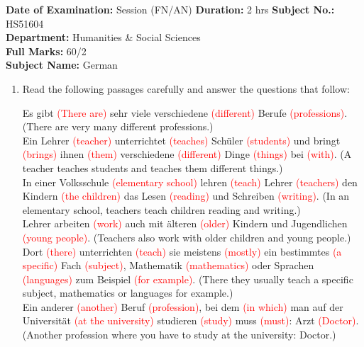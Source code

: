 \documentclass{article}
\title{}
\author{}
\date{}
\begin{document}
\maketitle

\noindent
\textbf{Date of Examination:} Session (FN/AN) \textbf{Duration:} 2 hrs \textbf{Subject No.:} HS51604 \\
\textbf{Department:} Humanities \& Social Sciences \\
\textbf{Full Marks:} 60/2 \\
\textbf{Subject Name:} German

\begin{enumerate}
    \item Read the following passages carefully and answer the questions that follow:

    Es gibt \textcolor{red}{(There are)} sehr viele verschiedene \textcolor{red}{(different)} Berufe \textcolor{red}{(professions)}. (There are very many different professions.) \\
    Ein Lehrer \textcolor{red}{(teacher)} unterrichtet \textcolor{red}{(teaches)} Schüler \textcolor{red}{(students)} und bringt \textcolor{red}{(brings)} ihnen \textcolor{red}{(them)} verschiedene \textcolor{red}{(different)} Dinge \textcolor{red}{(things)} bei \textcolor{red}{(with)}. (A teacher teaches students and teaches them different things.) \\
    In einer Volksschule \textcolor{red}{(elementary school)} lehren \textcolor{red}{(teach)} Lehrer \textcolor{red}{(teachers)} den Kindern \textcolor{red}{(the children)} das Lesen \textcolor{red}{(reading)} und Schreiben \textcolor{red}{(writing)}. (In an elementary school, teachers teach children reading and writing.) \\
    Lehrer arbeiten \textcolor{red}{(work)} auch mit älteren \textcolor{red}{(older)} Kindern und Jugendlichen \textcolor{red}{(young people)}. (Teachers also work with older children and young people.) \\
    Dort \textcolor{red}{(there)} unterrichten \textcolor{red}{(teach)} sie meistens \textcolor{red}{(mostly)} ein bestimmtes \textcolor{red}{(a specific)} Fach \textcolor{red}{(subject)}, Mathematik \textcolor{red}{(mathematics)} oder Sprachen \textcolor{red}{(languages)} zum Beispiel \textcolor{red}{(for example)}. (There they usually teach a specific subject, mathematics or languages for example.) \\
    Ein anderer \textcolor{red}{(another)} Beruf \textcolor{red}{(profession)}, bei dem \textcolor{red}{(in which)} man auf der Universität \textcolor{red}{(at the university)} studieren \textcolor{red}{(study)} muss \textcolor{red}{(must)}: Arzt \textcolor{red}{(Doctor)}. (Another profession where you have to study at the university: Doctor.) \\

\end{enumerate}
\end{document}
